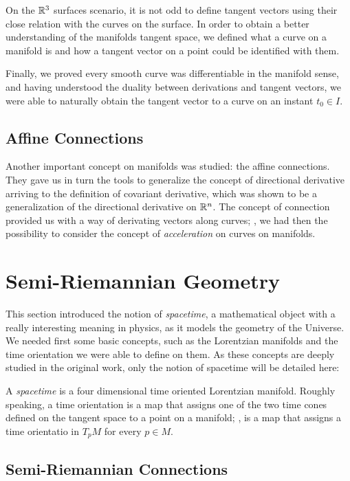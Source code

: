 On the $\mathbb{R}^3$ surfaces scenario, it is not odd to define tangent vectors using their close relation with the curves on the surface. In order to obtain a better understanding of the manifolds tangent space, we defined what a curve on a manifold is and how a tangent vector on a point could be identified with them.

Finally, we proved every smooth curve was differentiable in the manifold sense, and having understood the duality between derivations and tangent vectors, we were able to naturally obtain the tangent vector to a curve on an instant $t_0\in I$.

\subsection{Affine Connections}
\label{sec:affineconnections}

Another important concept on manifolds was studied: the affine connections. They gave us in turn the tools to generalize the concept of directional derivative arriving to the definition of covariant derivative, which was shown to be a generalization of the directional derivative on $\mathbb{R}^n$. The concept of connection provided us with a way of derivating vectors along curves; \ie, we had then the possibility to consider the concept of \emph{acceleration} on curves on manifolds.


\section{Semi-Riemannian Geometry}
\label{chapter:semiriemannian}

This section introduced the notion of \emph{spacetime}, a mathematical object with a really interesting meaning in physics, as it models the geometry of the Universe. We needed first some basic concepts, such as the Lorentzian manifolds and the time orientation we were able to define on them. As these concepts are deeply studied in the original work, only the notion of spacetime will be detailed here:

A \emph{spacetime} is a four dimensional time oriented Lorentzian manifold. Roughly speaking, a time orientation is a map that assigns one of the two time cones defined on the tangent space to a point on a manifold; \ie, is a map that assigns a time orientatio in $T_pM$ for every $p \in M$.

\subsection{Semi-Riemannian Connections}

